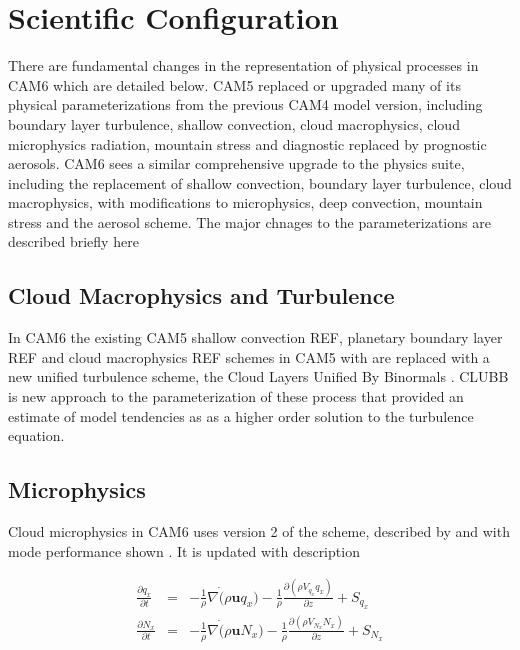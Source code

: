 \section{Scientific Configuration}
\label{sec:description}
There are fundamental changes in the representation of physical processes in CAM6 which are detailed below. CAM5 replaced or upgraded many of its physical parameterizations from the previous CAM4 model version, including boundary layer turbulence, shallow convection, cloud macrophysics, cloud microphysics radiation, mountain stress and diagnostic replaced by prognostic aerosols. CAM6 sees a similar comprehensive upgrade to the physics suite, including the replacement of shallow convection, boundary layer turbulence, cloud macrophysics, with modifications to microphysics, deep convection, mountain stress and the aerosol scheme. The major chnages to the parameterizations are described briefly here  


\subsection{Cloud Macrophysics and Turbulence}

In CAM6 the existing CAM5 shallow convection REF, planetary boundary layer REF and cloud macrophysics REF schemes in CAM5 with are replaced with a new unified turbulence scheme, the Cloud Layers Unified By Binormals \citep[CLUBB,][]{Golaz2002a,Golaz2002b}. CLUBB is new approach to the parameterization of these process that provided an estimate of model tendencies as as a higher order solution to the turbulence equation. 



\subsection{Microphysics}

Cloud microphysics in CAM6 uses version 2 of the \cite{Morrison08} scheme, described by \cite{Gettelman2015} and with mode performance shown \cite{Gettelman2015a}. It is updated with description 

\begin{eqnarray}
  \frac{\partial q_x}{\partial t} & = & -\frac{1}{\rho}\nabla\dot(\rho \mathbf{u} q_x) - \frac{1}{\rho}\frac{\partial(\rho V_{q_x}q_x)}{\partial z}+S_{q_x}  \\
  \frac{\partial N_x}{\partial t} & = & -\frac{1}{\rho}\nabla\dot(\rho \mathbf{u} N_x) - \frac{1}{\rho}\frac{\partial(\rho V_{N_x}N_x)}{\partial z}+S_{N_x}
\end{eqnarray}

